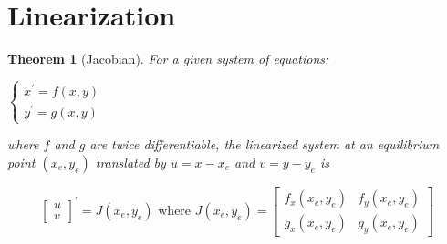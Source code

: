 \documentclass[12pt,landscape,twocolumn]{article}
\newtheorem{thm}{Theorem}
\begin{document}
\section{Linearization}
    \begin{thm}[Jacobian]
        For a given system of equations:

            $
                \begin{cases}
                    x^\prime = f(x, y)\\
                    y^\prime = g(x, y)
                \end{cases}
            $

        where $f$ and $g$ are twice differentiable, the linearized system at an equilibrium point $(x_e, y_e)$ translated by $u = x - x_e$ and $v = y - y_e$ is

            \begin{equation}\label{eq:jacobian}
                \left[ \begin{array}{c}
                    u\\
                    v
                \end{array} \right] ^\prime = J(x_e, y_e) \text{ where } J(x_e, y_e) = 
                \left[ \begin{array}{cc}
                    f_x(x_e, y_e) & f_y(x_e, y_e)\\
                    g_x(x_e, y_e) & g_y(x_e, y_e)
                \end{array} \right]
            \end{equation}

    \end{thm}
\end{document}
